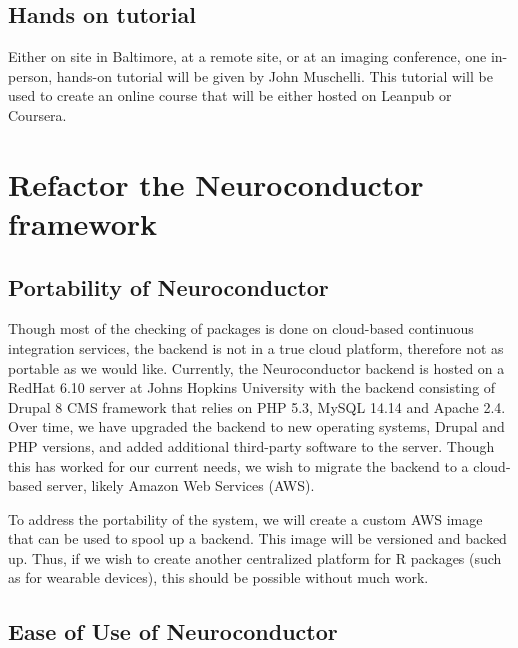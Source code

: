 \documentclass[]{elsarticle} %
\begin{document}
\hypertarget{hands-on-tutorial}{%
\subsection{Hands on tutorial}\label{hands-on-tutorial}}

Either on site in Baltimore, at a remote site, or at an imaging conference, one in-person, hands-on tutorial will be given by John Muschelli. This tutorial will be used to create an online course that will be either hosted on Leanpub or Coursera.

\hypertarget{refactor-the-neuroconductor-framework}{%
\section{Refactor the Neuroconductor framework}\label{refactor-the-neuroconductor-framework}}

\hypertarget{portability-of-neuroconductor}{%
\subsection{Portability of Neuroconductor}\label{portability-of-neuroconductor}}

Though most of the checking of packages is done on cloud-based continuous integration services, the backend is not in a true cloud platform, therefore not as portable as we would like. Currently, the Neuroconductor backend is hosted on a RedHat 6.10 server at Johns Hopkins University with the backend consisting of Drupal 8 CMS framework that relies on PHP 5.3, MySQL 14.14 and Apache 2.4. Over time, we have upgraded the backend to new operating systems, Drupal and PHP versions, and added additional third-party software to the server. Though this has worked for our current needs, we wish to migrate the backend to a cloud-based server, likely Amazon Web Services (AWS).

To address the portability of the system, we will create a custom AWS image that can be used to spool up a backend. This image will be versioned and backed up. Thus, if we wish to create another centralized platform for R packages (such as for wearable devices), this should be possible without much work.

\hypertarget{ease-of-use-of-neuroconductor}{%
\subsection{Ease of Use of Neuroconductor}\label{ease-of-use-of-neuroconductor}}
\end{document}

